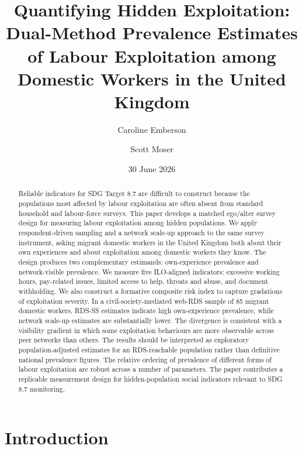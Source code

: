 \documentclass[
  12pt,
  letterpaper,
  DIV=11,
  numbers=noendperiod]{scrartcl}
\title{Quantifying Hidden Exploitation: Dual-Method Prevalence Estimates
of Labour Exploitation among Domestic Workers in the United Kingdom}
\author{Caroline Emberson \and Scott Moser}
\date{30 June 2026}
\begin{document}
\maketitle
\begin{abstract}
Reliable indicators for SDG Target 8.7 are difficult to construct
because the populations most affected by labour exploitation are often
absent from standard household and labour-force surveys. This paper
develops a matched ego/alter survey design for measuring labour
exploitation among hidden populations. We apply respondent-driven
sampling and a network scale-up approach to the same survey instrument,
asking migrant domestic workers in the United Kingdom both about their
own experiences and about exploitation among domestic workers they know.
The design produces two complementary estimands: own-experience
prevalence and network-visible prevalence. We measure five ILO-aligned
indicators: excessive working hours, pay-related issues, limited access
to help, threats and abuse, and document withholding. We also construct
a formative composite risk index to capture gradations of exploitation
severity. In a civil-society-mediated web-RDS sample of 85 migrant
domestic workers, RDS-SS estimates indicate high own-experience
prevalence, while network scale-up estimates are substantially lower.
The divergence is consistent with a visibility gradient in which some
exploitation behaviours are more observable across peer networks than
others. The results should be interpreted as exploratory
population-adjusted estimates for an RDS-reachable population rather
than definitive national prevalence figures. The relative ordering of
prevalence of different forms of labour exploitation are robust across a
number of parameters. The paper contributes a replicable measurement
design for hidden-population social indicators relevant to SDG 8.7
monitoring.
\end{abstract}


\section{Introduction}\label{sec-intro}
\end{document}
